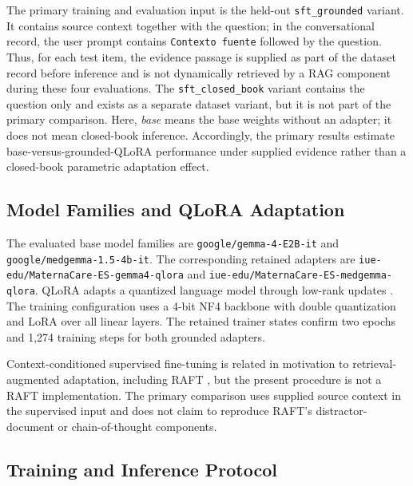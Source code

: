 The primary training and evaluation input is the held-out \texttt{sft\_grounded} variant. It contains source context together with the question; in the conversational record, the user prompt contains \texttt{Contexto fuente} followed by the question. Thus, for each test item, the evidence passage is supplied as part of the dataset record before inference and is not dynamically retrieved by a RAG component during these four evaluations. The \texttt{sft\_closed\_book} variant contains the question only and exists as a separate dataset variant, but it is not part of the primary comparison. Here, \emph{base} means the base weights without an adapter; it does not mean closed-book inference. Accordingly, the primary results estimate base-versus-grounded-QLoRA performance under supplied evidence rather than a closed-book parametric adaptation effect.

\subsection{Model Families and QLoRA Adaptation}

The evaluated base model families are \texttt{google/}\allowbreak\texttt{gemma-4-E2B-it} and \texttt{google/}\allowbreak\texttt{medgemma-1.5-4b-it}. The corresponding retained adapters are \texttt{iue-edu/}\allowbreak\texttt{MaternaCare-ES-}\allowbreak\texttt{gemma4-qlora} and \texttt{iue-edu/}\allowbreak\texttt{MaternaCare-ES-}\allowbreak\texttt{medgemma-qlora}. QLoRA adapts a quantized language model through low-rank updates \cite{Dettmers2023QLoRA}. The training configuration uses a 4-bit NF4 backbone with double quantization and LoRA over all linear layers. The retained trainer states confirm two epochs and 1,274 training steps for both grounded adapters.

Context-conditioned supervised fine-tuning is related in motivation to retrieval-augmented adaptation, including RAFT \cite{Zhang2024RAFT}, but the present procedure is not a RAFT implementation. The primary comparison uses supplied source context in the supervised input and does not claim to reproduce RAFT's distractor-document or chain-of-thought components.

\subsection{Training and Inference Protocol}

